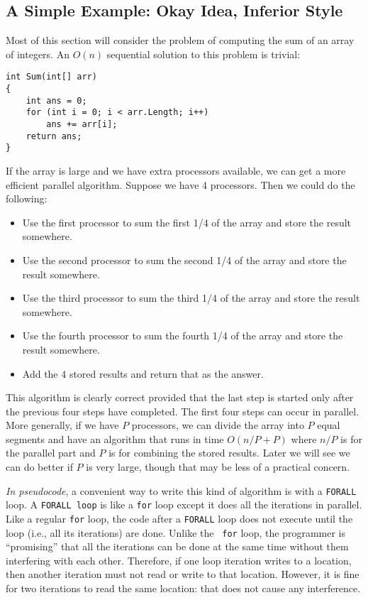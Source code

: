 \documentclass[10pt]{article}
\begin{document}
\subsection{A Simple Example: Okay Idea, Inferior Style}
\label{sec:csharp-threads}

Most of this section will consider the problem of computing the sum of
an array of integers.  An $O(n)$ sequential solution to this problem
is trivial:
\begin{verbatim}
int Sum(int[] arr)
{
    int ans = 0;
    for (int i = 0; i < arr.Length; i++)
        ans += arr[i];
    return ans;
}
\end{verbatim}
If the array is large and we have extra processors available, we can
get a more efficient parallel algorithm.  Suppose we have 4
processors.  Then we could do the following:
\begin{itemize}
\item Use the first processor to sum the first 1/4 of the array and
  store the result somewhere.
\item Use the second processor to sum the second 1/4 of the array and
  store the result somewhere.
\item Use the third processor to sum the third 1/4 of the array and
  store the result somewhere.
\item Use the fourth processor to sum the fourth 1/4 of the array and
  store the result somewhere.
\item Add the 4 stored results and return that as the answer.
\end{itemize}
This algorithm is clearly correct provided that the last step is
started only after the previous four steps have completed.  
The first four steps can occur in parallel.  More generally,
if we have $P$ processors, we can divide the array into $P$ equal
segments and have an algorithm that runs in time $O(n/P + P)$ where
$n/P$ is for the parallel part and $P$ is for combining the stored
results.  Later we will see we can do better if $P$ is very large,
though that may be less of a practical concern.

\emph{In pseudocode}, a convenient way to write this kind of algorithm
is with a {\tt FORALL} loop.  A {\tt FORALL loop} is like a {\tt for}
loop except it does all the iterations in parallel.  Like a regular
{\tt for} loop, the code after a {\tt FORALL} loop does not execute
until the loop (i.e., all its iterations) are done.  Unlike the {\tt
  for} loop, the programmer is ``promising'' that all the iterations
can be done at the same time without them interfering with each
other.  Therefore, if one loop iteration writes to a location, then
another iteration must not read or write to that location.  However,
it is fine for two iterations to read the same location: that does not
cause any interference.
\end{document}
